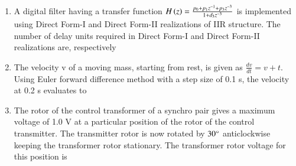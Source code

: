 \documentclass[journal,12pt,onecolumn]{IEEEtran}
\theoremstyle{remark}
\begin{document}
\begin{enumerate}
\item A digital filter having a transfer function $H\left(z\right) = \frac{p_0 + p_1 z^{-1} + p_3 z^{-3}}{1 + d_3 z^{-3}}$ is implemented using Direct Form-I and Direct Form-II realizations of IIR structure. The number of delay units required in Direct Form-I and Direct Form-II realizations are, respectively

\hfill{}\begin{enumerate}  \end{enumerate}



\item The velocity v  of a moving mass, starting from rest, is given as $\frac{dv}{dt} = v+t$. Using Euler forward difference method  with a step size of 0.1 s, the velocity at 0.2 s evaluates to

\hfill{}\begin{enumerate}  \end{enumerate}



\item The rotor of the control transformer of a synchro pair gives a maximum voltage of 1.0 V at a particular position of the rotor of the control transmitter. The transmitter rotor is now rotated by $30\degree$ anticlockwise keeping the transformer rotor stationary. The transformer rotor voltage for this position is

\hfill{}\begin{enumerate}  \end{enumerate}




\end{enumerate}
\end{document}
